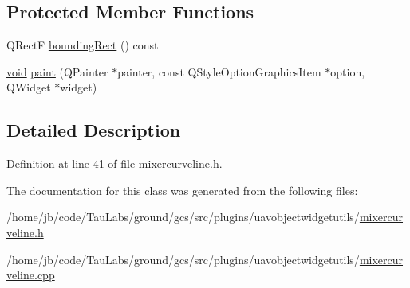 \subsection*{\-Protected \-Member \-Functions}
\begin{DoxyCompactItemize}
\item 
\-Q\-Rect\-F \hyperlink{group___u_a_v_object_widget_utils_ga1715832a609af81720fbed8340ddcd51}{bounding\-Rect} () const 
\item 
\hyperlink{group___u_a_v_objects_plugin_ga444cf2ff3f0ecbe028adce838d373f5c}{void} \hyperlink{group___u_a_v_object_widget_utils_ga6fb73701d0e4739f569e1ea0eb4c36fa}{paint} (\-Q\-Painter $\ast$painter, const \-Q\-Style\-Option\-Graphics\-Item $\ast$option, \-Q\-Widget $\ast$widget)
\end{DoxyCompactItemize}


\subsection{\-Detailed \-Description}


\-Definition at line 41 of file mixercurveline.\-h.



\-The documentation for this class was generated from the following files\-:\begin{DoxyCompactItemize}
\item 
/home/jb/code/\-Tau\-Labs/ground/gcs/src/plugins/uavobjectwidgetutils/\hyperlink{mixercurveline_8h}{mixercurveline.\-h}\item 
/home/jb/code/\-Tau\-Labs/ground/gcs/src/plugins/uavobjectwidgetutils/\hyperlink{mixercurveline_8cpp}{mixercurveline.\-cpp}\end{DoxyCompactItemize}
